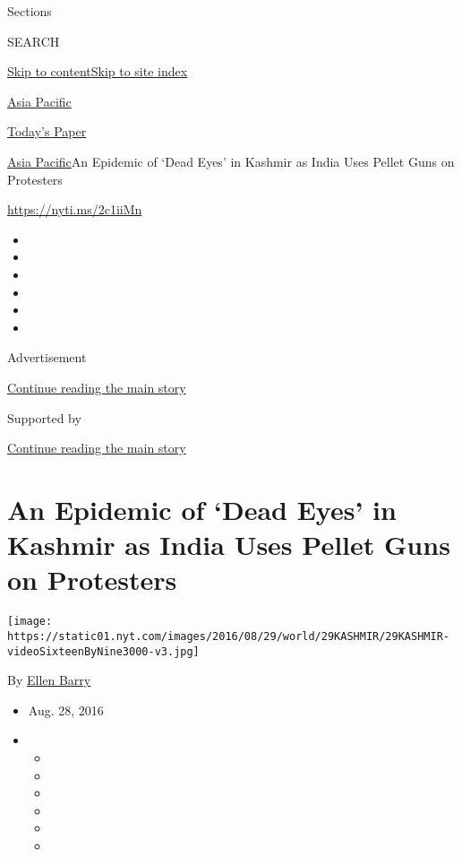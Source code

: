 Sections

SEARCH

\protect\hyperlink{site-content}{Skip to
content}\protect\hyperlink{site-index}{Skip to site index}

\href{https://www.nytimes.com/section/world/asia}{Asia Pacific}

\href{https://myaccount.nytimes.com/auth/login?response_type=cookie\&client_id=vi}{}

\href{https://www.nytimes.com/section/todayspaper}{Today's Paper}

\href{/section/world/asia}{Asia Pacific}\textbar{}An Epidemic of `Dead
Eyes' in Kashmir as India Uses Pellet Guns on Protesters

\url{https://nyti.ms/2c1iiMn}

\begin{itemize}
\item
\item
\item
\item
\item
\item
\end{itemize}

Advertisement

\protect\hyperlink{after-top}{Continue reading the main story}

Supported by

\protect\hyperlink{after-sponsor}{Continue reading the main story}

\hypertarget{an-epidemic-of-dead-eyes-in-kashmir-as-india-uses-pellet-guns-on-protesters}{%
\section{An Epidemic of `Dead Eyes' in Kashmir as India Uses Pellet Guns
on
Protesters}\label{an-epidemic-of-dead-eyes-in-kashmir-as-india-uses-pellet-guns-on-protesters}}

\texttt{[image: https://static01.nyt.com/images/2016/08/29/world/29KASHMIR/29KASHMIR-videoSixteenByNine3000-v3.jpg]}

By \href{https://www.nytimes.com/by/ellen-barry}{Ellen Barry}

\begin{itemize}
\item
  Aug. 28, 2016
\item
  \begin{itemize}
  \item
  \item
  \item
  \item
  \item
  \item
  \end{itemize}
\end{itemize}

